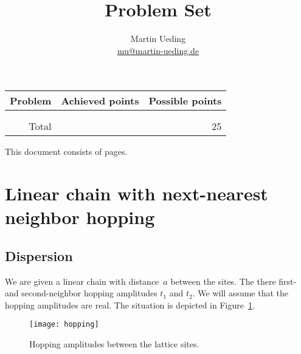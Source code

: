 \documentclass[11pt, english, fleqn, DIV=15, headinclude, BCOR=1cm]{scrartcl}
\title{Problem Set \arabic{problemset}}
\author{
    Martin Ueding \\ \small{\href{mailto:mu@martin-ueding.de}{mu@martin-ueding.de}}
}
\newcounter{totalpoints}
\begin{document}
\maketitle

\vspace{3ex}

\begin{center}
    \begin{tabular}{rrr}
        \toprule
        Problem & Achieved points & Possible points \\
        \midrule
        \nameref{homework:1} & & \\
        \nameref{homework:2} & & \\
        \midrule
        Total & & 25 \\
        \bottomrule
    \end{tabular}
\end{center}

\vspace{3ex}

\begin{center}
    \begin{small}
        This document consists of \pageref{LastPage} pages.
    \end{small}
\end{center}

\section{Linear chain with next-nearest neighbor hopping}
\label{homework:1}

\subsection{Dispersion}

We are given a linear chain with distance~$a$ between the sites. The there
first- and second-neighbor hopping amplitudes $t_1$ and $t_2$. We will assume
that the hopping amplitudes are real. The situation is depicted in
Figure~\ref{fig:hopping}.

\begin{figure}[tb]
    \centering
    \texttt{[image: hopping]}
    \caption{%
        Hopping amplitudes between the lattice sites.
    }
    \label{fig:hopping}
\end{figure}
\end{document}
